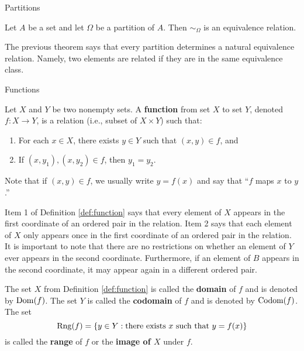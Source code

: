 \begin{section}{Partitions}
\begin{theorem}
Let $A$ be a set and let $\Omega$ be a partition of $A$.  Then $\sim_{\Omega}$ is an equivalence relation.
\end{theorem}

\begin{remark}
The previous theorem says that every partition determines a natural equivalence relation.  Namely, two elements are related if they are in the same equivalence class.
\end{remark}

\end{section}

\begin{section}{Functions}

\begin{definition}
Let $X$ and $Y$ be two nonempty sets.  A \textbf{function} from set $X$ to set $Y$, denoted $f:X\to Y$, is a relation (i.e., subset of $X\times Y$) such that:

\begin{enumerate}\label{def:function}
\item For each $x\in X$, there exists $y\in Y$ such that $(x,y)\in f$, and
\item If $(x,y_{1}), (x,y_{2}) \in f$, then $y_{1}=y_{2}$.
\end{enumerate}
Note that if $(x,y)\in f$, we usually write $y=f(x)$ and say that ``$f$ maps $x$ to $y$.''
\end{definition}

\begin{remark}
Item 1 of Definition \ref{def:function} says that every element of $X$ appears in the first coordinate of an ordered pair in the relation.  Item 2 says that each element of $X$ only appears once in the first coordinate of an ordered pair in the relation.  It is important to note that there are no restrictions on whether an element of $Y$ ever appears in the second coordinate.  Furthermore, if an element of $B$ appears in the second coordinate, it may appear again in a different ordered pair.
\end{remark}

\begin{definition}
The set $X$ from Definition \ref{def:function} is called the \textbf{domain} of $f$ and is denoted by $\operatorname{Dom}(f)$.  The set $Y$ is called the \textbf{codomain} of $f$ and is denoted by $\operatorname{Codom}(f)$.  The set
\[
\operatorname{Rng}(f)=\{y\in Y: \mbox{there exists }x\mbox{ such that } y=f(x)\}
\]
is called the \textbf{range} of $f$ or the \textbf{image of $X$} under $f$.
\end{definition}


\end{section}
